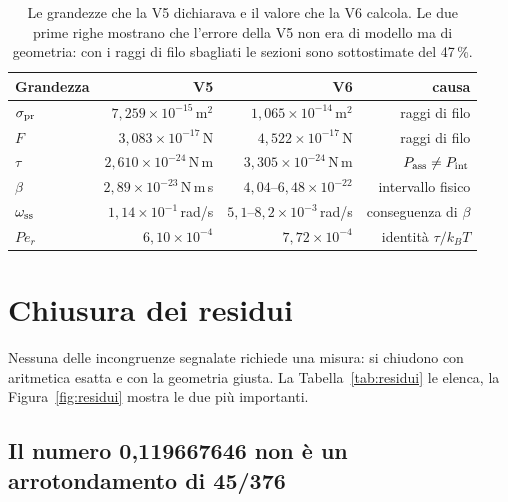 \documentclass[11pt,a4paper]{article}
\providecommand{\toprule}{\hline}
\providecommand{\midrule}{\hline}
\providecommand{\bottomrule}{\hline}
\begin{document}
\begin{table}[H]
\centering\small
\caption{Le grandezze che la V5 dichiarava e il valore che la V6 calcola. Le due
prime righe mostrano che l'errore della V5 non era di modello ma di geometria: con
i raggi di filo sbagliati le sezioni sono sottostimate del 47\,\%.}
\label{tab:confronto}
\begin{tabular}{lrrr}
\toprule
Grandezza & V5 & V6 & causa \\
\midrule
$\sigma_{\rm pr}$ & $7{,}259\times10^{-15}$\,m$^2$ & $1{,}065\times10^{-14}$\,m$^2$ & raggi di filo \\
$F$ & $3{,}083\times10^{-17}$\,N & $4{,}522\times10^{-17}$\,N & raggi di filo \\
$\tau$ & $2{,}610\times10^{-24}$\,N\,m & $3{,}305\times10^{-24}$\,N\,m & $P_{\rm ass}\neq P_{\rm int}$ \\
$\beta$ & $2{,}89\times10^{-23}$\,N\,m\,s & $4{,}04$--$6{,}48\times10^{-22}$ & intervallo fisico \\
$\omega_{\rm ss}$ & $1{,}14\times10^{-1}$\,rad/s & $5{,}1$--$8{,}2\times10^{-3}$\,rad/s & conseguenza di $\beta$ \\
$Pe_r$ & $6{,}10\times10^{-4}$ & $7{,}72\times10^{-4}$ & identit\`a $\tau/k_BT$ \\
\bottomrule
\end{tabular}
\end{table}

\section{Chiusura dei residui}

Nessuna delle incongruenze segnalate richiede una misura: si chiudono con aritmetica
esatta e con la geometria giusta. La Tabella~\ref{tab:residui} le elenca, la
Figura~\ref{fig:residui} mostra le due pi\`u importanti.

\begin{table}[H]
\centering\small
\caption{Residui e loro chiusura. I valori della colonna V6 sono prodotti da
\texttt{v6\_studi.py}.}
\label{tab:residui}

\end{table}

\subsection{Il numero 0{,}119667646 non \`e un arrotondamento di 45/376}
\end{document}
